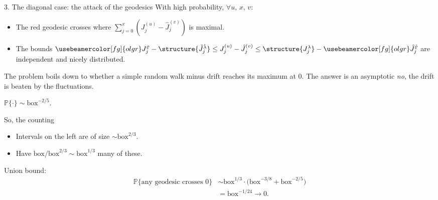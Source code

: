 \documentclass[compress,xcolor=dvipsnames]{beamer}
\newcounter{ups}
\newcommand*{\srw}[7][]{
 
 \setcounter{ups}{0}
 \foreach\i in{1,...,{#7}}{
  \FPrandom{\x}

  \FPeval{\startx}{(#2)+(\i-1)*(#4)}
  \FPeval{\starty}{(#3)+(2*\theups-\i+1)*#5+(i-1)*(#6)}
  \ifthenelse{\lengthtest{\x pt > 0.5 pt}}{
   \stepcounter{ups}
  }
  {
  }
  \FPeval{\endx}{(#2)+\i*(#4)}
  \FPeval{\endy}{(#3)+(2*\theups-\i)*#5+i*(#6)}
  \draw[#1](\startx,\starty) -- (\endx,\endy);
 }
}
\newcommand*{\vr}{\varrho}
\newcommand*{\la}{\lambda}
\newcommand*{\Pv}{{\mathbb P}}
\newcommand*{\olgr}[1]{{\usebeamercolor[fg]{olgr}#1}}
\begin{document}
\begin{frame}{3. The diagonal case: the attack of the geodesics}
 With high probability, \(\forall u,\,x,\,v\):
 \begin{itemize}
  \item The \alert{red geodesic} crosses where \(\sum_{j=0}^x(J^{(u)}_j-\hat J^{(v)}_j)\) is maximal.
  \item The bounds \(\olgr{J_j^\vr}-\structure{\hat J^{\hat\la}_j}\le J^{(u)}_j-\hat J^{(v)}_j\le\structure{J^\la_j}-\olgr{\hat J^{\hat\vr}_j}\) are independent and nicely distributed.
 \end{itemize}

 The problem boils down to whether a simple random walk minus drift reaches its maximum at 0. The answer is an asymptotic \emph{no}, the drift is beaten by the fluctuations.
 \begin{center}
 \end{center}
 \(\Pv\{\cdot\}\sim\text{box}^{-2/5}\).
\end{frame}

\begin{frame}{So, the counting}
 \begin{itemize}
  \item Intervals on the left are of size \(\sim\text{box}^{2/3}\).
  \item Have \(\text{box}/\text{box}^{2/3}\sim\text{box}^{1/3}\) many of these.  
 \end{itemize}
 \structure{\(\leadsto\)} Union bound:
 \[
  \begin{aligned}
   \Pv\{\text{any geodesic crosses }0\}&\sim\text{box}^{1/3}\cdot\bigl(\text{box}^{-3/8}+\text{box}^{-2/5}\bigr)\\
   &=\text{box}^{-1/24}\to0.
  \end{aligned}
 \]
\end{frame}

\end{document}
